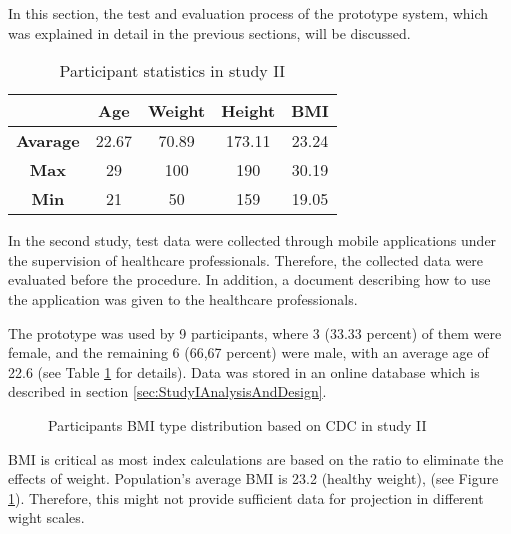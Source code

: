 In this section, the test and evaluation process of the prototype system, which was explained in detail in the previous sections, will be discussed.

\begin{table}[htbp]
\begin{center}
\caption{Participant statistics in study II}
\vspace{23pt}
      \begin{tabular}{|c|c|c|c|c|} \hline
          & \textbf{Age} & \textbf{Weight} & \textbf{Height} & \textbf{BMI} \\ \hline
        \textbf{Avarage} & 22.67 & 70.89 & 173.11 & 23.24 \\ \hline
        \textbf{Max} & 29 & 100 & 190 & 30.19 \\ \hline
        \textbf{Min} & 21 & 50 & 159 & 19.05 \\ \hline
    \end{tabular}
\label{tab:StudyIIParticipantStatistics}
\end{center}
\end{table}

In the second study, test data were collected through mobile applications under the supervision of healthcare professionals. Therefore, the collected data were evaluated before the procedure. In addition, a document describing how to use the application was given to the healthcare professionals.

The prototype was used by 9 participants, where 3 (33.33 percent) of them were female, and the remaining 6 (66,67 percent) were male, with an average age of 22.6 (see Table \ref{tab:StudyIIParticipantStatistics} for details). Data was stored in an online database which is described in section \ref{sec:StudyIAnalysisAndDesign}.

\begin{figure}[htbp]
\centering
{}
\caption{Participants BMI type distribution based on CDC in study II}
\label{fig:StudyIIParticipantsBMITypeDistribution}
\end{figure}

BMI is critical as most index calculations are based on the ratio to eliminate the effects of weight. Population's average BMI is 23.2 (healthy weight), (see Figure \ref{fig:StudyIIParticipantsBMITypeDistribution}). Therefore, this might not provide sufficient data for projection in different wight scales.

